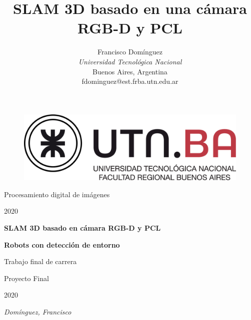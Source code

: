 \documentclass[conference]{IEEEtran}
\numberwithin{equation}{section}
\begin{document}
\ifimagenespaper
\else
    \begin{titlepage}
\fi
\ifimagenes
    \ifimagenespaper
        \title{SLAM 3D basado en una cámara RGB-D y PCL}
        
        \author{{Francisco Domínguez}\\
        {\textit{Universidad Tecnológica Nacional}\\
        Buenos Aires, Argentina \\
        fdominguez@est.frba.utn.edu.ar}
        }
        \date{}
        \maketitle
        
        
        
        
        
        
        
        
        
    \fi
\else
    \centering
    \begin{figure}[t]
    	\centering
    	\includegraphics[scale=0.15]{utn.jpg}
        \vspace{0.5cm}
    \end{figure}%
\fi

\ifimagenes
	{\LARGE Procesamiento digital de imágenes\par}
    {\LARGE 2020\par}
	\vspace{1cm}
	{\huge\bfseries SLAM 3D basado en cámara RGB-D y PCL\par}
\else
	{\huge\bfseries Robots con detección de entorno\par}
	\vspace{1cm}
    {\LARGE Trabajo final de carrera\par}
	\vspace{1cm}
	{\LARGE Proyecto Final\par}
    {\LARGE 2020\par}
\fi
    \vspace{1cm}
	{\Large\itshape Domínguez, Francisco\par}
	\vfill
\end{titlepage}
\end{document}
